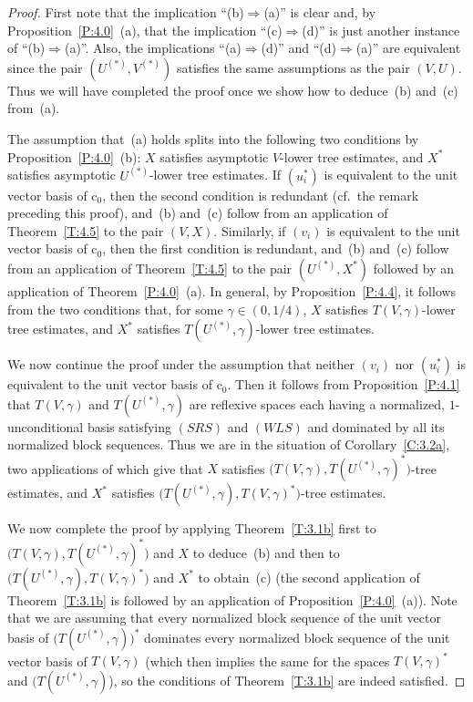 \documentclass[11pt,leqno]{amsart}
\theoremstyle{definition}
\newcommand{\co}{\mathrm{c}_0}
\newcommand{\Us}{U^{(*)}}
\newcommand{\Vs}{V^{(*)}}
\begin{document}
\begin{proof}
  First note that the implication ``(b)$\Rightarrow$(a)'' is clear
  and, by Proposition~\ref{P:4.0}~(a), that the implication
  ``(c)$\Rightarrow$(d)'' is just another instance of
  ``(b)$\Rightarrow$(a)''. Also, the implications
  ``(a)$\Rightarrow$(d)''  and ``(d)$\Rightarrow$(a)'' are
  equivalent since the pair $(\Us,\Vs)$ satisfies the same assumptions
  as the pair $(V,U)$. Thus we will have completed the proof once we
  show how to deduce~(b) and~(c) from~(a).

  The assumption that~(a) holds splits into the following two
  conditions by Proposition~\ref{P:4.0}~(b): $X$ satisfies asymptotic
  $V$-lower tree estimates, and $X^*$ satisfies asymptotic $\Us$-lower
  tree estimates. If $(u_i^*)$ is equivalent to the unit vector basis
  of $\co$, then the second condition is redundant (cf.~the remark
  preceding this proof), and~(b) and~(c) follow from an application of
  Theorem~\ref{T:4.5} to the pair $(V,X)$. Similarly, if $(v_i)$ is
  equivalent to the unit vector basis of $\co$, then the first
  condition is redundant, and~(b) and~(c) follow from an application
  of Theorem~\ref{T:4.5} to the pair $(\Us,X^*)$ followed by an
  application of Theorem~\ref{P:4.0}~(a). In general, by
  Proposition~\ref{P:4.4}, it follows from the two conditions that,
  for some $\gamma\in(0,1/4)$, $X$ satisfies 
  $T(V,\gamma)$-lower tree estimates, and $X^*$ satisfies 
  $T(\Us,\gamma)$-lower tree estimates.

  We now continue the proof under the assumption that neither $(v_i)$
  nor $(u_i^*)$ is equivalent to the unit vector basis of $\co$. Then
  it follows from Proposition~\ref{P:4.1} that $T(V,\gamma)$ and
  $T(\Us,\gamma)$ are reflexive spaces each having a normalized,
  $1$-unconditional basis satisfying $(SRS)$ and $(WLS)$ and dominated
  by all its normalized block sequences. Thus we are in the situation
  of Corollary~\ref{C:3.2a}, two applications of which give that 
  $X$ satisfies $\big(T(V,\gamma),T(\Us,\gamma)^*\big)$-tree
  estimates, and $X^*$ satisfies
  $\big(T(\Us,\gamma),T(V,\gamma)^*\big)$-tree estimates.

  We now complete the proof by applying Theorem~\ref{T:3.1b} first to
  $\big(T(V,\gamma),T(\Us,\gamma)^*\big)$ and $X$ to deduce~(b) and
  then to $\big(T(\Us,\gamma),T(V,\gamma)^*\big)$ and $X^*$ to
  obtain~(c) (the second application of Theorem~\ref{T:3.1b} is
  followed by an application of Proposition~\ref{P:4.0}~(a)). Note
  that we are assuming that every normalized block sequence of the
  unit vector basis of $\big(T(\Us,\gamma)\big)^*$ dominates every
  normalized block sequence of the unit vector basis of $T(V,\gamma)$
  (which then implies the same for the spaces $T(V,\gamma)^*$ and
  $(T(\Us,\gamma)$), so the conditions of Theorem~\ref{T:3.1b} are
  indeed satisfied.
\end{proof}
\end{document}
